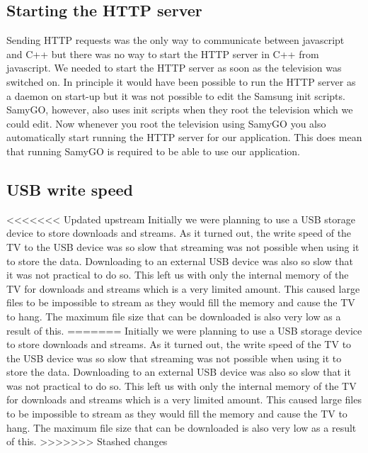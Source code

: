 \subsection{Starting the HTTP server}

Sending HTTP requests was the only way to communicate between javascript and C++ but there was no way to start the HTTP server in C++ from javascript. We needed to start the HTTP server as soon as the television was switched on. In principle it would have been possible to run the HTTP server as a daemon on start-up but it was not possible to edit the Samsung init scripts. SamyGO, however, also uses init scripts when they root the television which we could edit. Now whenever you root the television using SamyGO you also automatically start running the HTTP server for our application. This does mean that running SamyGO is required to be able to use our application.

\subsection{USB write speed}
<<<<<<< Updated upstream
Initially we were planning to use a USB storage device to store downloads and streams. As it turned out, the write speed of the TV to the USB device was so slow that streaming was not possible when using it to store the data. Downloading to an external USB device was also so slow that it was not practical to do so. This left us with only the internal memory of the TV for downloads and streams which is a very limited amount. This caused large files to be impossible to stream as they would fill the memory and cause the TV to hang. The maximum file size that can be downloaded is also very low as a result of this.
=======
Initially we were planning to use a USB storage device to store downloads and streams. As it turned out, the write speed of the TV to the USB device was so slow that streaming was not possible when using it to store the data. Downloading to an external USB device was also so slow that it was not practical to do so. This left us with only the internal memory of the TV for downloads and streams which is a very limited amount. This caused large files to be impossible to stream as they would fill the memory and cause the TV to hang. The maximum file size that can be downloaded is also very low as a result of this.
>>>>>>> Stashed changes
